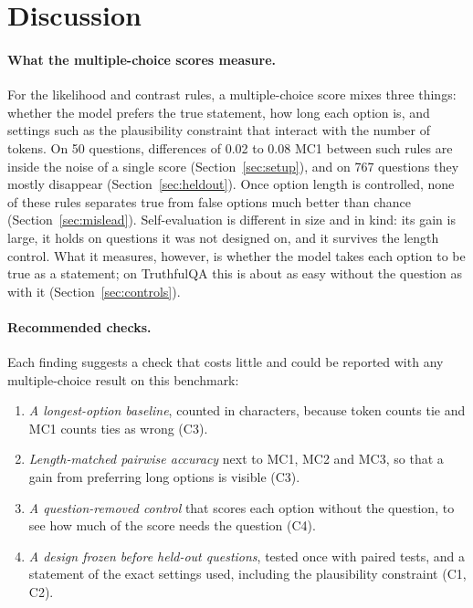 \documentclass[11pt]{article}
\newcommand{\cha}[1]{\textsf{C#1}}
\begin{document}
\begin{table}[t]
\centering\small\setlength{\tabcolsep}{3.5pt}
\caption{Self-evaluation against the base model's likelihood (sum and per token) on the 417 exploration questions.
Differences in MC1 with 95\,\% paired-bootstrap intervals (unadjusted, as fixed in the protocol). Beats both: both
differences positive with intervals above 0. $^\dagger$Verdict at chance level.}
\label{tab:likelihood}
\end{table}

\section{Discussion}
\label{sec:discussion}
\paragraph{What the multiple-choice scores measure.}
For the likelihood and contrast rules, a multiple-choice score mixes three things: whether the model prefers the true
statement, how long each option is, and settings such as the plausibility constraint that interact with the number
of tokens. On 50 questions, differences of 0.02 to 0.08 MC1 between such rules are inside the noise of a single
score (Section~\ref{sec:setup}), and on 767 questions they mostly disappear (Section~\ref{sec:heldout}). Once option
length is controlled, none of these rules separates true from false options much better than chance
(Section~\ref{sec:mislead}). Self-evaluation is different in size and in kind: its gain is large, it holds on
questions it was not designed on, and it survives the length control. What it measures, however, is whether the
model takes each option to be true as a statement; on TruthfulQA this is about as easy without the question as with
it (Section~\ref{sec:controls}).

\paragraph{Recommended checks.}
Each finding suggests a check that costs little and could be reported with any multiple-choice result on this
benchmark:
\begin{enumerate}
\item \emph{A longest-option baseline}, counted in characters, because token counts tie and MC1 counts ties as
  wrong (\cha3).
\item \emph{Length-matched pairwise accuracy} next to MC1, MC2 and MC3, so that a gain from preferring long options
  is visible (\cha3).
\item \emph{A question-removed control} that scores each option without the question, to see how much of the score
  needs the question (\cha4).
\item \emph{A design frozen before held-out questions}, tested once with paired tests, and a statement of the exact
  settings used, including the plausibility constraint (\cha1, \cha2).
\end{enumerate}
\end{document}
